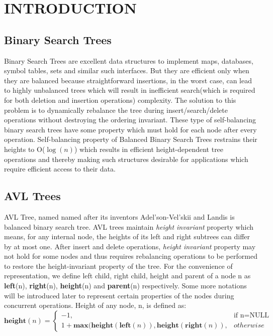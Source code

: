 \documentclass[MTech]{iitmdiss}
\begin{document}

\chapter{INTRODUCTION}
\label{chap:intro}

\section{Binary Search Trees}
Binary Search Trees are excellent data structures to implement maps, databases, symbol tables, sets and similar such interfaces. But they are efficient only when they are balanced because straightforward insertions, in the worst case, can lead to highly unbalanced trees which will result in inefficient search(which is required for both deletion and insertion operations) complexity.  The solution to this problem is to dynamically rebalance the tree during insert/search/delete operations without
destroying the ordering invariant. These type of self-balancing binary search trees have some property which must hold for each node after every operation. Self-balancing property of Balanced Binary Search Trees restrains their heights to O(\(\log(n)\)) which results in efficient height-dependent tree operations and thereby making such structures desirable for applications which require efficient access to their data. 


\section{AVL Trees}
AVL Tree, named named after its inventors Adel'son-Vel'skii and Landis is balanced binary search tree. AVL trees maintain \textit{height invariant} property which means, for any internal node, the heights of its left and right subtrees can differ by at most
one. After insert and delete operations, \textit{height invariant} property may not hold for some nodes and thus requires rebalancing operations to be performed to restore the height-invariant property of the tree. For the convenience of representation, we define left child, right child, height and parent of a node n as \textbf{left}(n),
\textbf{right}(n), \textbf{height}(n) and \textbf{parent}(n) respectively. Some more notations will be introduced later to represent certain properties of
the nodes during concurrent operations. Height of any node, n, is defined as:
\[
	\textbf{height}(n) = 
	\begin{cases*}
		-1, & \text{if n=NULL}\\
        1+\textbf{max}(\textbf{height}(\textbf{left}(n)), \textbf{height}(\textbf{right}(n)), & otherwise 
    \end{cases*}
\]
\end{document}
